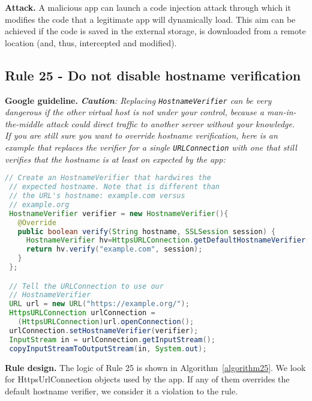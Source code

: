 \textbf{Attack.} A malicious app can launch a code injection attack through which it modifies the code that a legitimate app will dynamically load. This aim can be achieved if the code is saved in the external storage, is downloaded from a remote location (and, thus, intercepted and modified). 

\subsection{Rule 25 - Do not disable hostname verification}

\textbf{Google guideline.} \emph{\textbf{Caution}: Replacing \texttt{HostnameVerifier} can be \textit{very dangerous} if the other virtual host is not under your control, because a man-in-the-middle attack could direct traffic to another server without your knowledge.
\\
If you are still sure you want to override hostname verification, here is an example that replaces the verifier for a single \texttt{URLConnection} with one that still verifies that the hostname is at least on expected by the app:}
\begin{lstlisting}[language=Java, caption= problems with hostname verification, numbers=none]
 // Create an HostnameVerifier that hardwires the
 // expected hostname. Note that is different than
 // the URL's hostname: example.com versus
 // example.org
 HostnameVerifier verifier = new HostnameVerifier(){
   @Override
   public boolean verify(String hostname, SSLSession session) {
     HostnameVerifier hv=HttpsURLConnection.getDefaultHostnameVerifier();
     return hv.verify("example.com", session);
   }
 };

 // Tell the URLConnection to use our
 // HostnameVerifier
 URL url = new URL("https://example.org/");
 HttpsURLConnection urlConnection =
   (HttpsURLConnection)url.openConnection();
 urlConnection.setHostnameVerifier(verifier);
 InputStream in = urlConnection.getInputStream();
 copyInputStreamToOutputStream(in, System.out);

\end{lstlisting}

\textbf{Rule design.} The logic of Rule 25 is shown in Algorithm~\ref{algorithm25}. We look for HttpsUrlConnection objects used by the app. If any of them overrides the default hostname verifier, we consider it a violation to the rule. 

\setcounter{algocf}{24}
\begin{algorithm}[]
\SetAlgoLined
{}
\caption{}
\label{algorithm25}
\end{algorithm}

